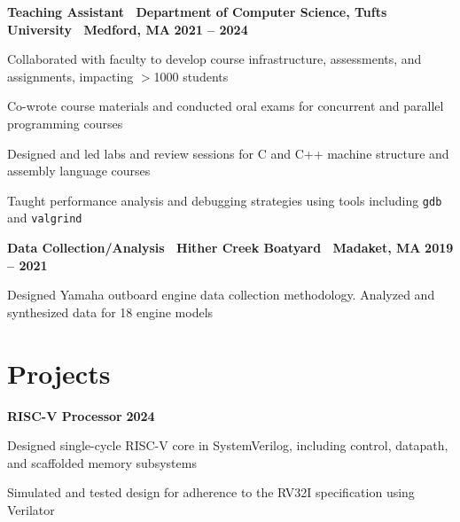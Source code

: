 \documentclass[10pt]{article}
\newenvironment{mylist}[1][]
{\itemize[nosep, wide=0pt, leftmargin=*, after=\strut]}
{\enditemize}
\begin{document}
\begin{minipage}[t]{\linewidth}
    \textbf{Teaching Assistant \textbar \ Department of Computer Science, Tufts University \textbar \ Medford, MA} \hfill \textbf{2021 -- 2024}
    \begin{mylist} 
        \item Collaborated with faculty to develop course infrastructure, assessments, and assignments, impacting $>$1000 students
        \item Co-wrote course materials and conducted oral exams for concurrent and parallel programming courses
        \item Designed and led labs and review sessions for C and C++ machine structure and assembly language courses
        \item Taught performance analysis and debugging strategies using tools including \texttt{gdb} and \texttt{valgrind}
    \end{mylist}
\end{minipage}

\begin{minipage}[t]{\linewidth}
    \textbf{Data Collection/Analysis \textbar \ Hither Creek Boatyard \textbar \ Madaket, MA} \hfill \textbf{2019 -- 2021}
    \begin{mylist}
        \item Designed Yamaha outboard engine data collection methodology. Analyzed and synthesized data for 18 engine models
    \end{mylist}
\end{minipage}


\section{Projects}

\begin{minipage}[t]{\linewidth}
    \textbf{RISC-V Processor} \hfill \textbf{2024}
    \begin{mylist}
    \item Designed single-cycle RISC-V core in SystemVerilog, including control, datapath, and scaffolded memory subsystems
    \item Simulated and tested design for adherence to the RV32I specification using Verilator
    \end{mylist}
\end{minipage}
\end{document}
